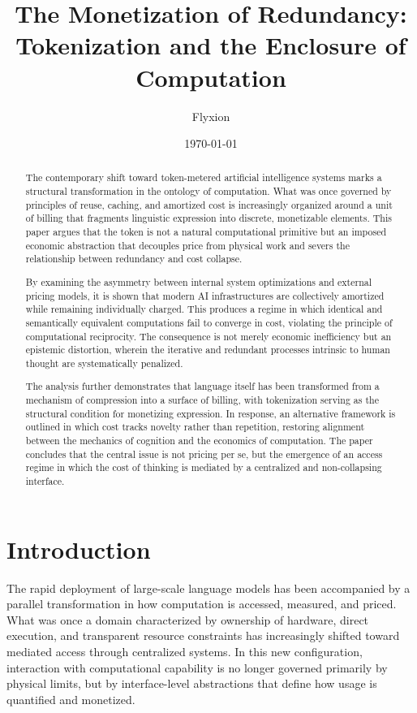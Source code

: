 \documentclass[12pt, oneside]{article}
\title{\textbf{The Monetization of Redundancy: \\ Tokenization and the Enclosure of Computation}}
\author{Flyxion}
\date{\today}
\begin{document}
\maketitle

\begin{abstract}
The contemporary shift toward token-metered artificial intelligence systems marks a structural transformation in the ontology of computation. What was once governed by principles of reuse, caching, and amortized cost is increasingly organized around a unit of billing that fragments linguistic expression into discrete, monetizable elements. This paper argues that the token is not a natural computational primitive but an imposed economic abstraction that decouples price from physical work and severs the relationship between redundancy and cost collapse.

By examining the asymmetry between internal system optimizations and external pricing models, it is shown that modern AI infrastructures are collectively amortized while remaining individually charged. This produces a regime in which identical and semantically equivalent computations fail to converge in cost, violating the principle of computational reciprocity. The consequence is not merely economic inefficiency but an epistemic distortion, wherein the iterative and redundant processes intrinsic to human thought are systematically penalized.

The analysis further demonstrates that language itself has been transformed from a mechanism of compression into a surface of billing, with tokenization serving as the structural condition for monetizing expression. In response, an alternative framework is outlined in which cost tracks novelty rather than repetition, restoring alignment between the mechanics of cognition and the economics of computation. The paper concludes that the central issue is not pricing per se, but the emergence of an access regime in which the cost of thinking is mediated by a centralized and non-collapsing interface.
\end{abstract}

\newpage

\section{Introduction}

The rapid deployment of large-scale language models has been accompanied by a parallel transformation in how computation is accessed, measured, and priced. What was once a domain characterized by ownership of hardware, direct execution, and transparent resource constraints has increasingly shifted toward mediated access through centralized systems. In this new configuration, interaction with computational capability is no longer governed primarily by physical limits, but by interface-level abstractions that define how usage is quantified and monetized.
\end{document}
